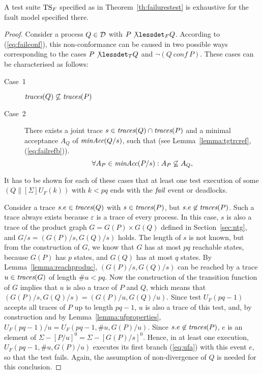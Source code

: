 %
\begin{lemma}\label{lemma:mainfexhaustive}
A test suite ${\text{TS}}_F$ specified as in Theorem~\ref{th:failurestest} is
exhaustive for the fault model specified there.
\end{lemma}
\begin{proof}
Consider a process $Q\in{\cal D}$ with $P\not\lessdet_F Q$. According to
(\ref{eq:failconf}), this non-conformance can be caused in two possible ways
corresponding to the cases $P\not\lessdet_T Q$ and $\neg(Q\ conf\ P)$. These
cases can be characterised as follows:
\begin{description}
\item[Case~1] $\text{\it traces}(Q)\not\subseteq \text{\it traces}(P)$
\item[Case~2] There exists a joint trace $s\in\text{\it traces}(Q)\cap\text{\it traces}(P)$ and a minimal acceptance $A_Q$
of $\text{\it minAcc}(Q/s)$, such that
(see Lemma~\ref{lemma:tgtrcref}, (\ref{eq:failrefb})).
\begin{equation}
\label{eq:accsnotcontained}
\forall A_P\in\text{\it minAcc}(P/s): A_P\not\subseteq A_Q,
\end{equation}
\end{description}
It has to be shown for each of these cases that at least one test execution
of some $(Q\parallel[\Sigma] U_F(k))$ with $k < pq$ ends with the ${\text{\it fail}}$
event or deadlocks.

\medskip
{} Consider a  trace $s.e\in\text{\it traces}(Q)$ with $s\in\text{\it traces}(P)$,
but $s.e\not\in\text{\it traces}(P)$. Such a trace always exists because $\varepsilon$ is
a trace of every process. In this case, $s$ is also a trace of the product
graph $G = G(P)\times G(Q)$ defined in Section~\ref{sec:ntg}, and $G/s =
(G(P)/s,G(Q)/s)$ holds. The length of $s$ is not known, but from the
construction of $G$,  we know that $G$ has at most $pq$ reachable states,
because $G(P)$ has $p$ states, and $G(Q)$ has at most $q$ states. By
Lemma~\ref{lemma:reachproduc}, $(G(P)/s,G(Q)/s)$ can be reached by a trace
$u\in\text{\it traces}(G)$ of length $\#u < pq$. Now the construction of the transition
function of $G$ implies that $u$ is also a trace of $P$ and $Q$, which means
that $(G(P)/s,G(Q)/s) = (G(P)/u,G(Q)/u)$. Since test $U_F(pq-1)$ accepts all
traces of $P$ up to length $pq-1$, $u$ is also a trace of this test, and, by
construction and by Lemma~\ref{lemma:ufproperties}, $U_F(pq-1)/u =
U_F(pq-1,\#u,G(P)/u)$. Since $s.e\not\in\text{\it traces}(P)$, $e$ is an element of
$\Sigma-[P/u]^0 = \Sigma - [G(P)/s]^0$. Hence, in at least one execution,
$U_F(pq-1,\#u,G(P)/u)$ executes its first branch (\ref{eq:ufa}) with this
event $e$, so that the test fails. Again, the assumption of non-divergence of
$Q$ is needed for this conclusion. 


\end{proof}
